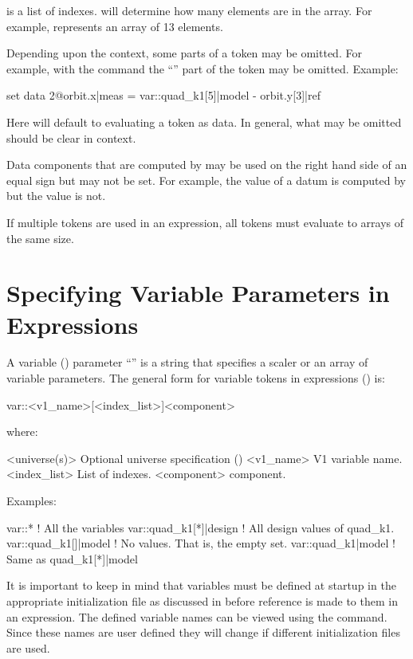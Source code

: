  is a list of indexes.  will determine
how many elements are in the array. For example,  
represents an array of 13 elements. 

Depending upon the context, some parts of a token may be omitted. For example,
with the  command the ``'' part of the token may be omitted.
Example:
\begin{example}
  set data 2@orbit.x|meas = var::quad_k1[5]|model - orbit.y[3]|ref
\end{example}
Here \tao will default to evaluating a token as data. In general, what may be omitted
should be clear in context.

Data components that are computed by \tao may be used on the right hand side of an equal
sign but may not be set. For example, the  value of a datum is computed by \tao
but the  value is not.

If multiple tokens are used in an expression, all tokens must evaluate to arrays of the
same size.

\section{Specifying Variable Parameters in Expressions}
\label{s:var.token}

A variable () parameter ``'' is a string that specifies a scaler or an array
of variable parameters. The general form for variable tokens in expressions
() is:
\begin{example}
  var::<v1_name>[<index_list>]<component>
\end{example}
where:
\begin{example}
  <universe(s)>       Optional universe specification ()
  <v1_name>           V1 variable name.
  <index_list>        List of indexes.
  <component>         component. 
\end{example}
Examples:
\begin{example}
  var::*                     ! All the variables
  var::quad_k1[*]|design     ! All design values of quad_k1.
  var::quad_k1[]|model       ! No values. That is, the empty set.
  var::quad_k1|model         ! Same as quad_k1[*]|model
\end{example}

It is important to keep in mind that variables must be defined at startup in the
appropriate initialization file as discussed in  before reference is made
to them in an expression.  The defined  variable names can be viewed using
the  command. Since these names are user defined they will change if different
initialization files are used.

